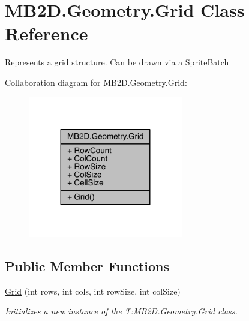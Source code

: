 \hypertarget{class_m_b2_d_1_1_geometry_1_1_grid}{}\section{M\+B2\+D.\+Geometry.\+Grid Class Reference}
\label{class_m_b2_d_1_1_geometry_1_1_grid}


Represents a grid structure. Can be drawn via a Sprite\+Batch  




Collaboration diagram for M\+B2\+D.\+Geometry.\+Grid\+:
\nopagebreak
\begin{figure}[H]
\begin{center}
\leavevmode
\includegraphics[width=191pt]{class_m_b2_d_1_1_geometry_1_1_grid__coll__graph}
\end{center}
\end{figure}
\subsection*{Public Member Functions}
\begin{DoxyCompactItemize}
\item 
\hyperlink{class_m_b2_d_1_1_geometry_1_1_grid_a7ff870c0156e2fb0fc5fffe081db4a10}{Grid} (int rows, int cols, int row\+Size, int col\+Size)
\begin{DoxyCompactList}\small\item\em Initializes a new instance of the T\+:\+M\+B2\+D.\+Geometry.\+Grid class. \end{DoxyCompactList}\end{DoxyCompactItemize}
